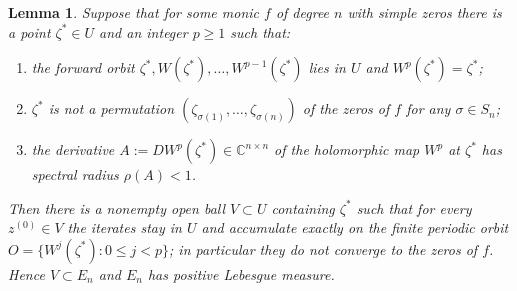 \documentclass{amsart}
\newtheorem{lemma}{Lemma}
\theoremstyle{definition}
\theoremstyle{remark}
\newcommand{\C}{\mathbb{C}}
\begin{document}
\begin{lemma}\label{lem:attr}
Suppose that for some monic $f$ of degree $n$ with simple zeros there is a point
$\zeta^{*}\in U$ and an integer $p\ge1$ such that:
\begin{enumerate}
\item the forward orbit $\zeta^{*},W(\zeta^{*}),\dots,W^{p-1}(\zeta^{*})$ lies in $U$ and
$W^{p}(\zeta^{*})=\zeta^{*}$;
\item $\zeta^{*}$ is \emph{not} a permutation
$(\zeta_{\sigma(1)},\dots,\zeta_{\sigma(n)})$ of the zeros of $f$ for any $\sigma\in S_n$;
\item the derivative $A:=DW^{p}(\zeta^{*})\in\C^{n\times n}$ of the holomorphic map $W^{p}$
at $\zeta^{*}$ has spectral radius $\rho(A)<1$.
\end{enumerate}
Then there is a nonempty open ball $V\subset U$ containing $\zeta^{*}$ such that for every
$z^{(0)}\in V$ the iterates stay in $U$ and accumulate exactly on the finite periodic orbit
$O=\{W^{j}(\zeta^{*}):0\le j<p\}$; in particular they do not converge to the zeros of $f$.
Hence $V\subset E_n$ and $E_n$ has positive Lebesgue measure.
\end{lemma}
\end{document}
